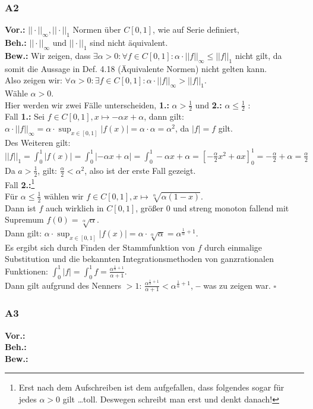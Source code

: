 \documentclass[12pt, a4paper]{article}
\newcommand*{\qed}{\null\nobreak\hfill\ensuremath{\square}}
\newcommand*{\gedanke}{\textbf{-- }}
\newcommand*{\gap}{\text{ }}
\newcommand*{\vor}{\textbf{Vor.:} \gap}
\newcommand*{\beh}{\textbf{Beh.:} \gap}
\newcommand*{\bew}{\textbf{Bew.:} \gap}
\begin{document}
\subsubsection*{A2}
\vor \(||\cdot||_\infty, ||\cdot||_1\) Normen über \(C[0,1]\), wie auf Serie definiert,\\
\beh \(||\cdot||_\infty \text{ und } ||\cdot||_1\) sind nicht äquivalent. \\
\bew Wir zeigen, dass \(\exists \alpha > 0: \forall f \in C[0,1]: \alpha \cdot ||f||_\infty \le ||f||_1\) nicht gilt, da somit die Aussage in Def. 4.18 (Äquivalente Normen) nicht gelten kann. \\
Also zeigen wir: \(\forall \alpha > 0: \exists f \in C[0,1]: \alpha \cdot ||f||_\infty > ||f||_1\). \\
Wähle \(\alpha > 0\).\\
Hier werden wir zwei Fälle unterscheiden, \textbf{1.:} \(\alpha > \frac{1}{2}\) und \textbf{2.:} \(\alpha \le \frac{1}{2}\) : \\
Fall \textbf{1.:} Sei \(f \in C[0,1], x \mapsto -\alpha x + \alpha\), dann gilt: \\
\(\alpha \cdot ||f||_\infty = \alpha \cdot \sup_{x\in [0,1]}|f(x)| = \alpha \cdot \alpha = \alpha^2\),  da \(|f| = f\) gilt. \\
Des Weiteren gilt: \(||f||_1 = \int_{0}^{1}|f(x)| = \int_{0}^{1}|-\alpha x + \alpha| = \int_{0}^{1}-\alpha x + \alpha = \left[-\frac{\alpha}{2}x^2+ ax\right]_0^1 = -\frac{\alpha}{2} + \alpha = \frac{\alpha}{2}\) \\
Da \(a > \frac{1}{2}\), gilt: \(\frac{\alpha}{2} < \alpha^2\), also ist der erste Fall gezeigt. \\
Fall \textbf{2.:}\footnote[1]{Erst nach dem Aufschreiben ist dem  aufgefallen, dass folgendes sogar für jedes \(\alpha > 0\) gilt \dots toll. Deswegen schreibt man erst und denkt danach!} \\
Für \(\alpha \le \frac{1}{2}\) wählen wir \(f \in C[0,1], x \mapsto \sqrt[\alpha]{\alpha(1-x)}\). \\
Dann ist \(f\) auch wirklich in \(C[0,1]\), größer 0 und streng monoton fallend mit Supremum \(f(0) = \sqrt[\alpha]{\alpha}\). \\
Dann gilt: \(\alpha \cdot \sup_{x \in [0,1]}|f(x)| = \alpha \cdot \sqrt[\alpha]{\alpha} = \alpha^{\frac{1}{\alpha} + 1}\). \\
Es ergibt sich durch Finden der Stammfunktion von \(f\) durch einmalige Substitution und die bekannten Integrationsmethoden von ganzrationalen Funktionen: \(\int_{0}^{1}|f| = \int_{0}^{1}f = \frac{\alpha^{\frac{1}{\alpha} + 1}}{\alpha + 1}\).\\
Dann gilt aufgrund des Nenners \(> 1\): \(\frac{\alpha^{\frac{1}{\alpha} + 1}}{\alpha + 1} < \alpha^ {\frac{1}{\alpha} + 1}\), \gedanke was zu zeigen war. \qed \pagebreak 
\subsubsection*{A3}
\vor \\
\beh \\
\bew \\
\end{document}
